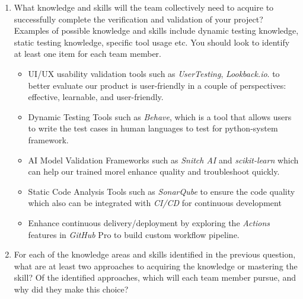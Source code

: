 \documentclass[12pt, titlepage]{article}
\begin{document}
\begin{enumerate}
  \item What knowledge and skills will the team collectively need to acquire to
  successfully complete the verification and validation of your project?
  Examples of possible knowledge and skills include dynamic testing knowledge,
  static testing knowledge, specific tool usage etc.  You should look to
  identify at least one item for each team member.


  \begin{itemize}
    \item UI/UX usability validation tools such  as \textit{UserTesting}, \textit{Lookback.io}. to better evaluate our product is user-friendly in a couple of perspectives: effective, learnable, and user-friendly.
    \item Dynamic Testing Tools such as \textit{Behave}, which is a tool that allows users to write the test cases in human languages to test for python-system framework. 
    \item AI Model Validation Frameworks such as \textit{Snitch AI} and \textit{scikit-learn} which can help our trained morel enhance quality and troubleshoot quickly.
    \item Static Code Analysis Tools such as \textit{SonarQube} to ensure the code quality which also can be integrated with \textit{CI/CD} for continuous development
    \item Enhance continuous delivery/deployment by exploring the \textit{Actions} features in \textit{GitHub} Pro to build custom workflow pipeline.
   \end{itemize} 


  \item For each of the knowledge areas and skills identified in the previous
  question, what are at least two approaches to acquiring the knowledge or
  mastering the skill?  Of the identified approaches, which will each team
  member pursue, and why did they make this choice?


\end{enumerate}
\end{document}
